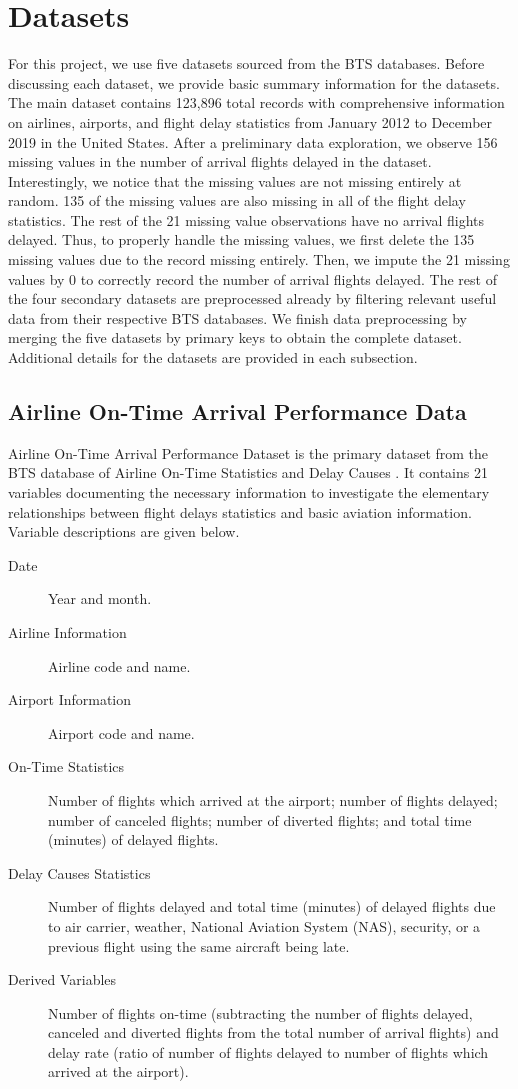 \documentclass[11pt]{article}
\begin{document}
\section{Datasets}\label{sec:data}
For this project, we use five datasets sourced from the BTS databases. Before discussing each dataset, we provide basic summary information for the datasets. The main dataset contains 123,896 total records with comprehensive information on airlines, airports, and flight delay statistics from January 2012 to December 2019 in the United States. After a preliminary data exploration, we observe 156 missing values in the number of arrival flights delayed in the dataset. Interestingly, we notice that the missing values are not missing entirely at random. 135 of the missing values are also missing in all of the flight delay statistics. The rest of the 21 missing value observations have no arrival flights delayed. Thus, to properly handle the missing values, we first delete the 135 missing values due to the record missing entirely. Then, we impute the 21 missing values by 0 to correctly record the number of arrival flights delayed. The rest of the four secondary datasets are preprocessed already by filtering relevant useful data from their respective BTS databases. We finish data preprocessing by merging the five datasets by primary keys to obtain the complete dataset. Additional details for the datasets are provided in each subsection.

\subsection{Airline On-Time Arrival Performance Data}
Airline On-Time Arrival Performance Dataset is the primary dataset from the BTS database of Airline On-Time Statistics and Delay Causes \citep{web:bts2}. It contains 21 variables documenting the necessary information to investigate the elementary relationships between flight delays statistics and basic aviation information. Variable descriptions are given below.

\begin{description}
\item [Date] Year and month.
\item [Airline Information] Airline code and name.
\item [Airport Information] Airport code and name.
\item [On-Time Statistics] Number of flights which arrived at the airport; number of flights delayed; number of canceled flights; number of diverted flights; and total time (minutes) of delayed flights.
\item [Delay Causes Statistics] Number of flights delayed and total time (minutes) of delayed flights due to air carrier, weather, National Aviation System (NAS), security, or a previous flight using the same aircraft being late.
\item [Derived Variables] Number of flights on-time (subtracting the number of flights delayed, canceled and diverted flights from the total number of arrival flights) and delay rate (ratio of number of flights delayed to number of flights which arrived at the airport).
\end{description}
\end{document}

